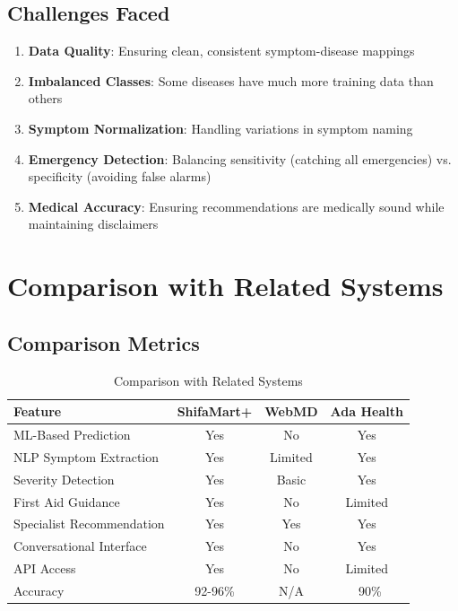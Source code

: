 \subsection{Challenges Faced}
\begin{enumerate}
    \item \textbf{Data Quality}: Ensuring clean, consistent symptom-disease mappings
    \item \textbf{Imbalanced Classes}: Some diseases have much more training data than others
    \item \textbf{Symptom Normalization}: Handling variations in symptom naming
    \item \textbf{Emergency Detection}: Balancing sensitivity (catching all emergencies) vs. specificity (avoiding false alarms)
    \item \textbf{Medical Accuracy}: Ensuring recommendations are medically sound while maintaining disclaimers
\end{enumerate}

\section{Comparison with Related Systems}
\subsection{Comparison Metrics}
\begin{table}[H]
\centering
\caption{Comparison with Related Systems}
\begin{tabular}{|l|c|c|c|}
\hline
\textbf{Feature} & \textbf{ShifaMart+} & \textbf{WebMD} & \textbf{Ada Health} \\
\hline
ML-Based Prediction & Yes & No & Yes \\
\hline
NLP Symptom Extraction & Yes & Limited & Yes \\
\hline
Severity Detection & Yes & Basic & Yes \\
\hline
First Aid Guidance & Yes & No & Limited \\
\hline
Specialist Recommendation & Yes & Yes & Yes \\
\hline
Conversational Interface & Yes & No & Yes \\
\hline
API Access & Yes & No & Limited \\
\hline
Accuracy & 92-96\% & N/A & ~90\% \\
\hline
\end{tabular}
\end{table}

